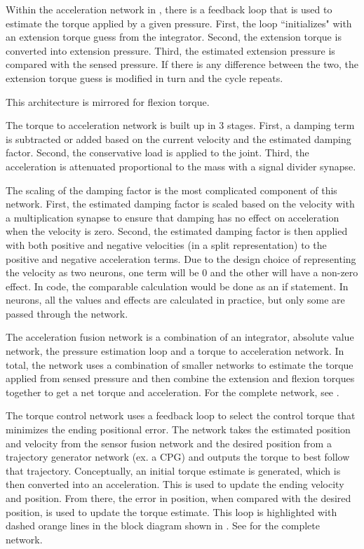 Within the acceleration network in , there is a feedback loop that is used to 
estimate the torque applied by a given pressure. First, the loop ``initializes"
with an extension torque guess from the integrator. Second, the extension
torque is converted into extension pressure. Third, the estimated extension
pressure is compared with the sensed pressure. If there is any difference between the
two, the extension torque guess is modified in turn and the cycle repeats.

This architecture is mirrored for flexion torque.

\label{sec:torque2accel}

The torque to acceleration network is built up in 3 stages. First, a damping 
term is subtracted or added based on the current velocity and the estimated
damping factor. Second, the conservative load is applied to the joint. Third,
the acceleration is attenuated proportional to the mass with a signal divider
synapse.

The scaling of the damping factor is the most complicated component of this
network. First, the estimated damping factor is scaled based on the velocity 
with a multiplication synapse to ensure that damping has no effect on acceleration
when the velocity is zero. Second, the estimated damping factor is then applied with both positive and
negative velocities (in a split representation) to the positive and negative
acceleration terms. Due to the design choice of representing the velocity as two
neurons, one term will be 0 and the other will have a 
non-zero effect. In code, the comparable calculation would be done as an if statement. In neurons,
all the values and effects are calculated in practice, but only some are passed
through the network.


The acceleration fusion network is a combination of an integrator, absolute
value network, the pressure estimation loop and a torque to acceleration
network. In total, the network uses a combination of smaller networks to
estimate the torque applied from sensed pressure and then combine the extension
and flexion torques together to get a net torque and acceleration. For the complete network, see .


The torque control network uses a feedback loop to select the
control torque that minimizes the ending positional error. The network takes the estimated position and velocity from the 
sensor fusion network and the desired position from a trajectory generator
network (ex. a CPG) and outputs the torque to best follow that trajectory. Conceptually, an initial torque estimate is generated, which is then converted into an acceleration. This is used to update the ending velocity and position. From there, the error in position, when compared with the desired position, is used to update the torque estimate. This loop is highlighted with dashed orange lines in the block diagram shown in .
See  for the complete network.

